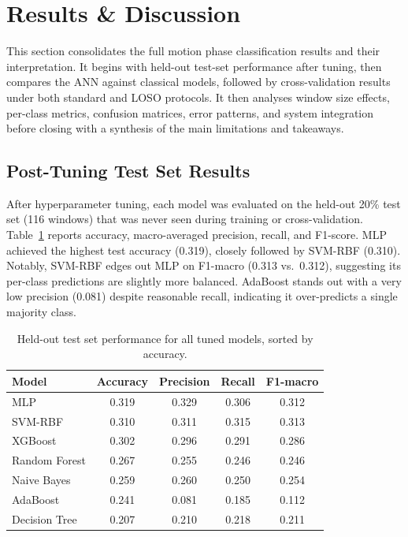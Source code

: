 \documentclass[12pt,a4paper]{cibb}
\begin{document}
\section{Results \& Discussion}
\label{sec:results_discussion}
This section consolidates the full motion phase classification results and their interpretation. It begins with held-out test-set performance after tuning, then compares the ANN against classical models, followed by cross-validation results under both standard and LOSO protocols. It then analyses window size effects, per-class metrics, confusion matrices, error patterns, and system integration before closing with a synthesis of the main limitations and takeaways.

\subsection{Post-Tuning Test Set Results}
After hyperparameter tuning, each model was evaluated on the held-out 20\% test set (116 windows) that was never seen during training or cross-validation. Table~\ref{tab:testresults} reports accuracy, macro-averaged precision, recall, and F1-score. MLP achieved the highest test accuracy (0.319), closely followed by SVM-RBF (0.310). Notably, SVM-RBF edges out MLP on F1-macro (0.313 vs.\ 0.312), suggesting its per-class predictions are slightly more balanced. AdaBoost stands out with a very low precision (0.081) despite reasonable recall, indicating it over-predicts a single majority class.

\begin{table}[H]
\centering
\small
\begin{tabular}{lcccc}
\toprule
\textbf{Model} & \textbf{Accuracy} & \textbf{Precision} & \textbf{Recall} & \textbf{F1-macro} \\
\midrule
\rowcolor{LightBlue} MLP           & 0.319 & 0.329 & 0.306 & 0.312 \\
SVM-RBF       & 0.310 & 0.311 & 0.315 & 0.313 \\
\rowcolor{LightBlue} XGBoost       & 0.302 & 0.296 & 0.291 & 0.286 \\
Random Forest & 0.267 & 0.255 & 0.246 & 0.246 \\
\rowcolor{LightBlue} Naive Bayes   & 0.259 & 0.260 & 0.250 & 0.254 \\
AdaBoost      & 0.241 & 0.081 & 0.185 & 0.112 \\
\rowcolor{LightBlue} Decision Tree & 0.207 & 0.210 & 0.218 & 0.211 \\
\bottomrule
\end{tabular}
\caption{Held-out test set performance for all tuned models, sorted by accuracy.\label{tab:testresults}}
\end{table}
\end{document}
